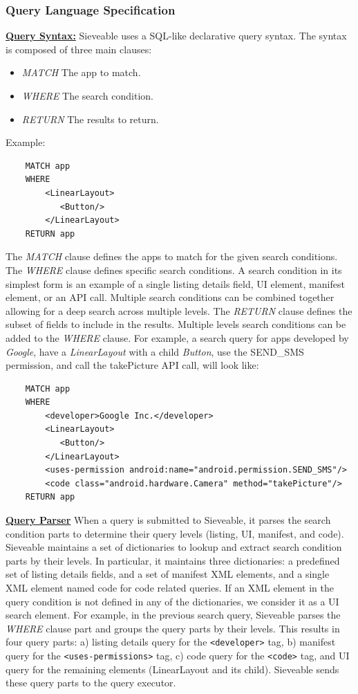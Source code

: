 \subsubsection{Query Language Specification}
\underline{\textbf{Query Syntax:}}
Sieveable uses a SQL-like declarative query syntax. The syntax is composed of three main clauses:
\begin{itemize}
	\item \textit{MATCH} The app to match. 
	\item \textit{WHERE} The search condition.
	\item \textit{RETURN} The results to return.
\end{itemize}
Example:
\begin{verbatim}
	MATCH app
	WHERE
	    <LinearLayout>
	       <Button/>
	    </LinearLayout>
	RETURN app
\end{verbatim}
The \textit{MATCH} clause defines the apps to match for the given search conditions.
The \textit{WHERE} clause defines specific search conditions. 
A search condition in its simplest form is an example of a single listing details field, UI element, manifest element, or an API call.
Multiple search conditions can be combined together allowing for a deep search across multiple levels.
The \textit{RETURN} clause defines the subset of fields to include in the results.
Multiple levels search conditions can be added to the \textit{WHERE} clause.
For example, a search query for apps developed by \textit{Google}, have a \textit{LinearLayout} with a child \textit{Button}, use the SEND\_SMS permission, and call the takePicture API call, will look like:
\begin{verbatim}
	MATCH app
	WHERE
    	<developer>Google Inc.</developer>
	    <LinearLayout>
	       <Button/>
     	</LinearLayout>
     	<uses-permission android:name="android.permission.SEND_SMS"/>
     	<code class="android.hardware.Camera" method="takePicture"/>
	RETURN app
\end{verbatim}

\underline{\textbf{Query Parser}}
When a query is submitted to Sieveable, it parses the search condition parts to determine their query levels (listing, UI, manifest, and code).
Sieveable maintains a set of dictionaries to lookup and extract search condition parts by their levels.
In particular, it maintains three dictionaries: a predefined set of listing details fields, and a set of manifest XML elements, and a single XML element named code for code related queries.
If an XML element in the query condition is not defined in any of the dictionaries, we consider it as a UI search element.
For example, in the previous search query, Sieveable parses the \textit{WHERE} clause part and groups the query parts by their levels. This results in four query parts: a) listing details query for the \texttt{<developer>} tag, b) manifest query for the \texttt{<uses-permissions>} tag, c) code query for the \texttt{<code>} tag, and UI query for the remaining elements (LinearLayout and its child). Sieveable sends these query parts to the query executor.

